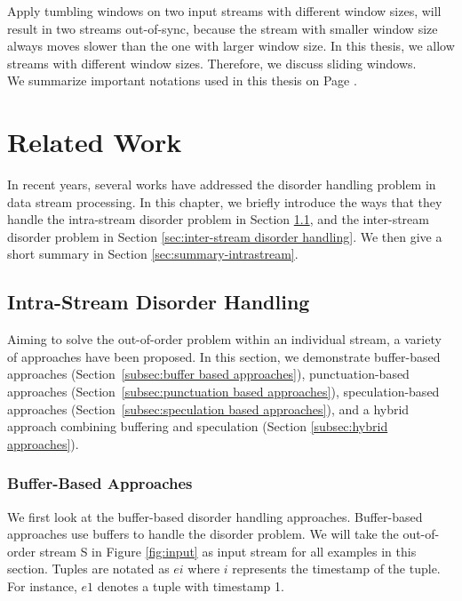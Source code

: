 \documentclass[a4paper, 11pt, twoside]{report}
\begin{document}
Apply tumbling windows on two input streams with different window sizes, will result in two streams out-of-sync, because the stream with smaller window size always moves slower than the one with larger window size. In this thesis, we allow streams with different window sizes. Therefore, we discuss sliding windows.\\

We summarize important notations used in this thesis on Page \pageref{nomenclature}.

\cleardoublepage

\chapter{Related Work}
\label{chapter:related-work}

In recent years, several works have addressed the disorder handling problem in data stream processing. In this chapter, we briefly introduce the ways that they handle the intra-stream disorder problem in Section \ref{subsec:intra-stream disorder handling}, and the inter-stream disorder problem in Section \ref{sec:inter-stream disorder handling}. We then give a short summary in Section \ref{sec:summary-intrastream}.\\

\section{Intra-Stream Disorder Handling}
\label{subsec:intra-stream disorder handling}
Aiming to solve the out-of-order problem within an individual stream, a variety of approaches have been proposed. In this section, we demonstrate buffer-based approaches (Section~\ref{subsec:buffer based approaches}), punctuation-based approaches (Section~\ref{subsec:punctuation based approaches}), speculation-based approaches (Section~\ref{subsec:speculation based approaches}), and a hybrid approach combining buffering and speculation (Section \ref{subsec:hybrid approaches}).\\

\subsection{Buffer-Based Approaches}
We first look at the buffer-based disorder handling approaches. Buffer-based approaches use buffers to handle the disorder problem. We will take the out-of-order stream S in Figure \ref{fig:input} as input stream for all examples in this section. Tuples are notated as $ei$ where $i$ represents the timestamp of the tuple. For instance, $e1$ denotes a tuple with timestamp 1.\\
\end{document}
